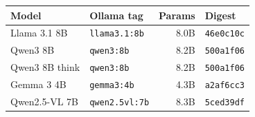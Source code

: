 \begin{tabular}{llrl}
\toprule
Model & Ollama tag & Params & Digest \\
\midrule
Llama 3.1 8B \cite{llama3} & \texttt{llama3.1:8b} & 8.0B & \texttt{46e0c10c} \\
Qwen3 8B \cite{qwen3} & \texttt{qwen3:8b} & 8.2B & \texttt{500a1f06} \\
Qwen3 8B think \cite{qwen3} & \texttt{qwen3:8b} & 8.2B & \texttt{500a1f06} \\
Gemma 3 4B \cite{gemma3} & \texttt{gemma3:4b} & 4.3B & \texttt{a2af6cc3} \\
Qwen2.5-VL 7B \cite{qwen25vl} & \texttt{qwen2.5vl:7b} & 8.3B & \texttt{5ced39df} \\
\bottomrule
\end{tabular}
